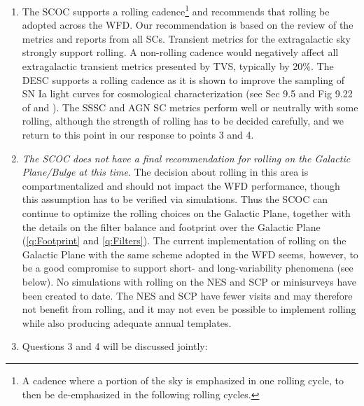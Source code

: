 \begin{enumerate}
    \item 
The SCOC supports a rolling cadence\footnote{A cadence where a portion of the sky is emphasized in one rolling cycle, to then be de-emphasized in the following rolling cycles.} and recommends that rolling be adopted across the WFD. Our recommendation is based on the review of the metrics and reports from all SCs. Transient metrics for the extragalactic sky strongly support rolling. A non-rolling cadence would negatively affect all extragalactic transient metrics presented by TVS, typically by 20\%.
 The DESC supports a rolling cadence as it is shown to improve the sampling of SN Ia light curves for cosmological characterization (see Sec 9.5 and Fig 9.22 of \citealt{cosep} and \citealt{https://doi.org/10.48550/arxiv.2210.15690}). The SSSC and AGN SC metrics perform well or neutrally with some rolling, although the strength of rolling has to be decided carefully, and we return to this point in our response to points 3 and 4. 
 
 \item \emph{The SCOC does not have a final recommendation for rolling on the Galactic Plane/Bulge at this time}. The decision about rolling in this area is compartmentalized and should not impact the WFD performance, though this assumption has to be verified via simulations. Thus the SCOC can continue to optimize the rolling choices on the Galactic Plane, together with the details on the filter balance and footprint over the Galactic Plane (\autoref{q:Footprint} and \autoref{q:Filters}). The current implementation of rolling on the Galactic Plane with the same scheme adopted in the WFD seems, however, to be a good compromise to support short- and long-variability phenomena (see below). No simulations with rolling on the NES and SCP or minisurveys have been created to date. The NES and SCP have fewer visits and may therefore not benefit from rolling, and it may not even be possible to implement rolling while also producing adequate annual templates. 

 \item Questions 3 and 4 will be discussed jointly: 
 

\end{enumerate}
